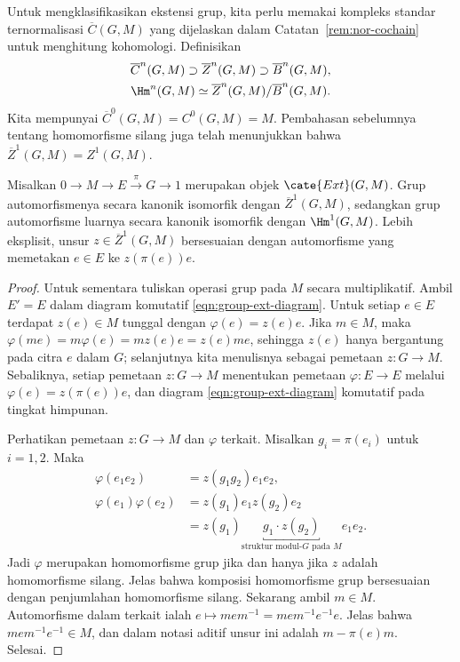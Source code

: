 Untuk mengklasifikasikan ekstensi grup, kita perlu memakai kompleks standar
ternormalisasi $\overline{C}(G,M)$ yang dijelaskan dalam
Catatan~\ref{rem:nor-cochain} untuk menghitung kohomologi. Definisikan
\begin{gather*}
	\overline{C}^n(G,M)\supset\overline{Z}^n(G,M)
	\supset\overline{B}^n(G,M),\\
	\Hm^n(G,M)\simeq\overline{Z}^n(G,M)/\overline{B}^n(G,M).
\end{gather*}
Kita mempunyai $\overline{C}^0(G,M)=C^0(G,M)=M$. Pembahasan sebelumnya
tentang homomorfisme silang juga telah menunjukkan bahwa
$\overline{Z}^1(G,M)=Z^1(G,M)$.

\begin{lemma}\label{prop:factor-set-prep}
	Misalkan $0\to M\to E\xrightarrow{\pi}G\to1$ merupakan objek
	$\cate{Ext}(G,M)$. Grup automorfismenya secara kanonik isomorfik dengan
	$\overline{Z}^1(G,M)$, sedangkan grup automorfisme luarnya secara kanonik
	isomorfik dengan $\Hm^1(G,M)$. Lebih eksplisit, unsur
	$z\in\overline{Z}^1(G,M)$ bersesuaian dengan automorfisme yang memetakan
	$e\in E$ ke $z(\pi(e))e$.
\end{lemma}
\begin{proof}
	Untuk sementara tuliskan operasi grup pada $M$ secara multiplikatif. Ambil
	$E'=E$ dalam diagram komutatif \eqref{eqn:group-ext-diagram}. Untuk setiap
	$e\in E$ terdapat $z(e)\in M$ tunggal dengan $\varphi(e)=z(e)e$. Jika
	$m\in M$, maka
	$\varphi(me)=m\varphi(e)=mz(e)e=z(e)me$, sehingga $z(e)$ hanya bergantung
	pada citra $e$ dalam $G$; selanjutnya kita menulisnya sebagai pemetaan
	$z:G\to M$. Sebaliknya, setiap pemetaan $z:G\to M$ menentukan pemetaan
	$\varphi:E\to E$ melalui $\varphi(e)=z(\pi(e))e$, dan diagram
	\eqref{eqn:group-ext-diagram} komutatif pada tingkat himpunan.

	Perhatikan pemetaan $z:G\to M$ dan $\varphi$ terkait. Misalkan
	$g_i=\pi(e_i)$ untuk $i=1,2$. Maka
	\begin{align*}
		\varphi(e_1e_2)&=z(g_1g_2)e_1e_2,\\
		\varphi(e_1)\varphi(e_2)&=z(g_1)e_1z(g_2)e_2\\
		&=z(g_1)\underbracket{g_1\cdot z(g_2)}_{
		\text{struktur modul-$G$ pada $M$}}e_1e_2.
	\end{align*}
	Jadi $\varphi$ merupakan homomorfisme grup jika dan hanya jika $z$ adalah
	homomorfisme silang. Jelas bahwa komposisi homomorfisme grup bersesuaian
	dengan penjumlahan homomorfisme silang. Sekarang ambil $m\in M$.
	Automorfisme dalam terkait ialah
	$e\mapsto mem^{-1}=mem^{-1}e^{-1}e$. Jelas bahwa
	$mem^{-1}e^{-1}\in M$, dan dalam notasi aditif unsur ini adalah
	$m-\pi(e)m$. Selesai.
\end{proof}

